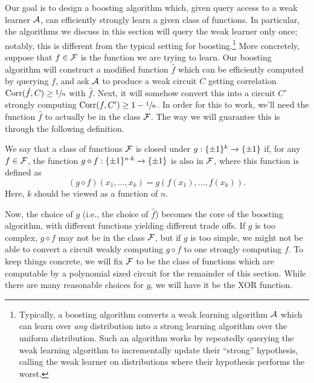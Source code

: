 \documentclass[11pt]{article}
\begin{document}
Our goal is to design a boosting algorithm which, given query access to a weak learner $\mathcal{A}$, can efficiently strongly learn a given class of functions. In particular, the algorithms we discuss in this section will query the weak learner only once; notably, this is different from the typical setting for boosting.\footnote{Typically, a boosting algorithm converts a weak learning algorithm $\mathcal{A}$ which can learn over \emph{any} distribution into a strong learning algorithm over the uniform distribution. Such an algorithm works by repeatedly querying the weak learning algorithm to incrementally update their ``strong'' hypothesis, calling the weak learner on distributions where their hypothesis performs the worst.} More concretely, suppose that $f \in \mathcal{F}$ is the function we are trying to learn. Our boosting algorithm will construct a modified function $\hat{f}$ which can be efficiently computed by querying $f$, and ask $\mathcal{A}$ to produce a weak circuit $C$ getting correlation $\mathrm{Corr}(\hat{f}, C) \geq \sfrac{1}{n}$ with $\hat{f}$. Next, it will somehow convert this into a circuit $C'$ strongly computing $\mathrm{Corr}(f, C') \geq 1 - \sfrac{1}{n}$. In order for this to work, we'll need the function $\hat{f}$ to actually be in the class $\mathcal{F}$. The way we will guarantee this is through the following definition.

\begin{definition}{3.2}
    We say that a class of functions $\mathcal{F}$ is closed under $g : \{\pm 1\}^k \rightarrow \{\pm 1\}$ if, for any $f \in \mathcal{F}$, the function $g \diamond f : \{\pm 1\}^{n \cdot k} \rightarrow \{\pm 1\}$ is also in $\mathcal{F}$, where this function is defined as
    \begin{equation*}
        (g \diamond f)(x_1, \ldots, x_k) = g(f(x_1), \ldots, f(x_k)).
    \end{equation*}
    Here, $k$ should be viewed as a function of $n$.
\end{definition}

Now, the choice of $g$ (i.e., the choice of $\hat{f}$) becomes the core of the boosting algorithm, with different functions yielding different trade offs. If $g$ is too complex, $g \diamond f$ may not be in the class $\mathcal{F}$, but if $g$ is too simple, we might not be able to convert a circuit weakly computing $g \diamond f$ to one strongly computing $f$. To keep things concrete, we will fix $\mathcal{F}$ to be the class of functions which are computable by a polynomial sized circuit for the remainder of this section. While there are many reasonable choices for $g$, we will have it be the XOR function. 
\end{document}

